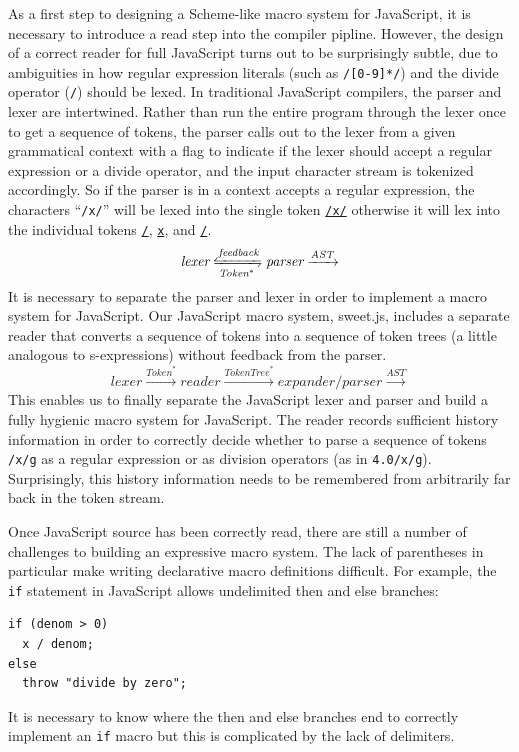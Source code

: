 \documentclass[preprint,10pt]{sigplanconf}
\begin{document}
As a first step to designing a Scheme-like macro system for
JavaScript, it is necessary to introduce a read step into the compiler
pipline. However, the design of a correct reader for full JavaScript
turns out to be surprisingly subtle, due to ambiguities in how regular
expression literals (such as \verb!/[0-9]*/!) and the divide
operator (\verb!/!) should be lexed. In traditional JavaScript
compilers, the parser and lexer are intertwined. Rather than run the
entire program through the lexer once to get a sequence of tokens, the
parser calls out to the lexer from a given grammatical context with a
flag to indicate if the lexer should accept a regular expression or
a divide operator, and the input character stream is tokenized accordingly.
So if the parser is in a context accepts a regular expression, the characters ``\verb!/x/!'' will be lexed into the single token \underline{\verb!/x/!} otherwise it will lex into the individual tokens \underline{\verb!/!}, \underline{\verb!x!}, and \underline{\verb!/!}.
\[
\textit{lexer} \xleftrightharpoons[\textit{Token}^{*}]{\textit{feedback}}
\textit{parser} \xrightarrow{\textit{AST}}
\]
It is necessary to separate the parser and lexer in order to implement
a macro system for JavaScript. Our JavaScript macro system,
sweet.js, includes a separate
reader that converts a sequence of tokens into a sequence of token
trees (a little analogous to s-expressions) without feedback from the
parser.
\[
\textit{lexer} \xrightarrow{\textit{Token}^{*}}
\textit{reader} \xrightarrow{\textit{TokenTree}^{*}}
\textit{expander/parser} \xrightarrow{\textit{AST}}
\]
This enables us to finally separate the JavaScript lexer and parser
and build a fully hygienic macro system for JavaScript.
The reader records sufficient history information in order to 
correctly decide whether to parse a sequence of tokens
\verb!/x/g! as a regular expression or as division operators 
(as in \verb!4.0/x/g!). Surprisingly, this history
information needs to be remembered from arbitrarily far back in the
token stream.


Once JavaScript source has been correctly read, there are still a
number of challenges to building an expressive macro system. The lack
of parentheses in particular make writing declarative macro
definitions difficult. For example, the \verb!if! statement in
JavaScript allows undelimited then and else branches:
\begin{lstlisting}
if (denom > 0)
  x / denom;
else
  throw "divide by zero";
\end{lstlisting}
It is necessary to know where the then and else branches end to
correctly implement an \verb!if! macro but this is complicated by
the lack of delimiters. 
\end{document}

